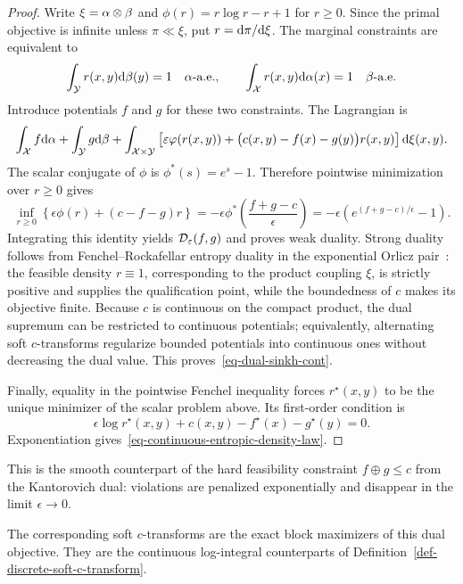 \begin{proof}
	Write $\xi=\alpha\otimes\beta$ and $\phi(r)=r\log r-r+1$ for $r\geq0$. Since the primal objective is infinite unless $\pi\ll\xi$, put $r=\mathrm{d}\pi/\mathrm{d}\xi$. The marginal constraints are equivalent to
	\[
		\int_{\mathcal{Y}}r(x,y)\mathrm{d}\beta(y)=1\quad\alpha\text{-a.e.},
		\qquad
		\int_{\mathcal{X}}r(x,y)\mathrm{d}\alpha(x)=1\quad\beta\text{-a.e.}
	\]
	Introduce potentials $f$ and $g$ for these two constraints. The Lagrangian is
	\[
		\int_{\mathcal{X}}f\mathrm{d}\alpha+\int_{\mathcal{Y}}g\mathrm{d}\beta
		+
		\int_{\mathcal{X}\times\mathcal{Y}}
		\left[
			\varepsilon\varphi(r(x,y))
			+\bigl(c(x,y)-f(x)-g(y)\bigr)r(x,y)
		\right]\mathrm{d}\xi(x,y).
	\]
	The scalar conjugate of $\phi$ is $\phi^*(s)=e^s-1$. Therefore pointwise minimization over $r\geq0$ gives
	\[
		\inf_{r\geq0}
		\left\{
			\epsilon\phi(r)+(c-f-g)r
		\right\}
		=
		-\epsilon\phi^*\!\left(\frac{f+g-c}{\epsilon}\right)
		=
		-\epsilon\left(e^{(f+g-c)/\epsilon}-1\right).
	\]
	Integrating this identity yields $\mathcal{D}_\varepsilon(f,g)$ and proves weak duality. Strong duality follows from Fenchel--Rockafellar entropy duality in the exponential Orlicz pair~\cite{leonard2012schrodinger,2017-carlier-SIMA}: the feasible density $r\equiv1$, corresponding to the product coupling $\xi$, is strictly positive and supplies the qualification point, while the boundedness of $c$ makes its objective finite. Because $c$ is continuous on the compact product, the dual supremum can be restricted to continuous potentials; equivalently, alternating soft $c$-transforms regularize bounded potentials into continuous ones without decreasing the dual value. This proves~\eqref{eq-dual-sinkh-cont}.

	Finally, equality in the pointwise Fenchel inequality forces $r^\star(x,y)$ to be the unique minimizer of the scalar problem above. Its first-order condition is
	\[
		\epsilon\log r^\star(x,y)
		{}+c(x,y)-f^\star(x)-g^\star(y)=0.
	\]
	Exponentiation gives~\eqref{eq-continuous-entropic-density-law}.
\end{proof}

This is the smooth counterpart of the hard feasibility constraint $f\oplus g\leq c$ from the Kantorovich dual: violations are penalized exponentially and disappear in the limit $\epsilon\to0$.

The corresponding soft $c$-transforms are the exact block maximizers of this dual objective. They are the continuous log-integral counterparts of Definition~\ref{def-discrete-soft-c-transform}.

